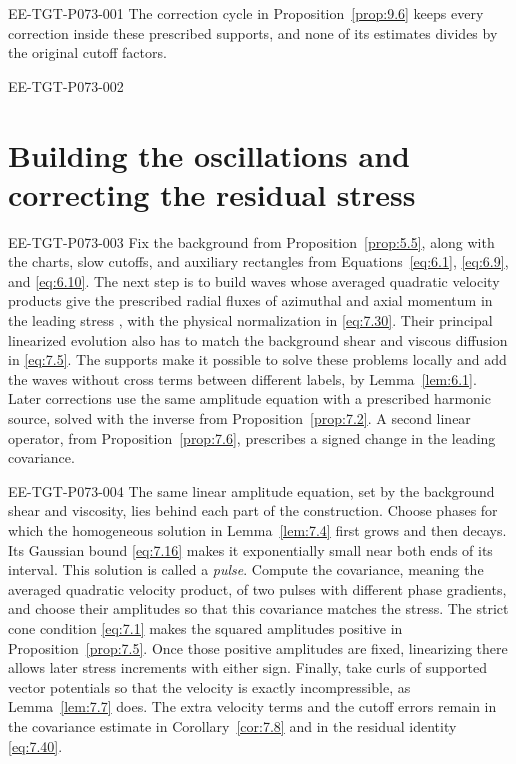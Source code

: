 %
\begin{EESegment}{EE-TGT-P073-001}
The correction cycle in Proposition~\ref{prop:9.6} keeps every correction inside these prescribed supports, and none of its estimates divides by the original cutoff factors.
\end{EESegment}

\begin{EESegment}{EE-TGT-P073-002}
\section{Building the oscillations and correcting the residual stress}\label{sec:7}
\end{EESegment}

\begin{EESegment}{EE-TGT-P073-003}
Fix the background  from Proposition~\ref{prop:5.5}, along with the charts, slow cutoffs, and auxiliary rectangles from Equations~\eqref{eq:6.1}, \eqref{eq:6.9}, and \eqref{eq:6.10}. The next step is to build waves whose averaged quadratic velocity products give the prescribed radial fluxes of azimuthal and axial momentum in the leading stress , with the physical normalization in \eqref{eq:7.30}. Their principal linearized evolution also has to match the background shear and viscous diffusion in \eqref{eq:7.5}. The supports make it possible to solve these problems locally and add the waves without cross terms between different labels, by Lemma~\ref{lem:6.1}. Later corrections use the same amplitude equation with a prescribed harmonic source, solved with the inverse from Proposition~\ref{prop:7.2}. A second linear operator,  from Proposition~\ref{prop:7.6}, prescribes a signed change in the leading covariance.
\end{EESegment}

\begin{EESegment}{EE-TGT-P073-004}
The same linear amplitude equation, set by the background shear and viscosity, lies behind each part of the construction. Choose phases for which the homogeneous solution  in Lemma~\ref{lem:7.4} first grows and then decays. Its Gaussian bound \eqref{eq:7.16} makes it exponentially small near both ends of its interval. This solution is called a \emph{pulse}. Compute the covariance, meaning the averaged quadratic velocity product, of two pulses with different phase gradients, and choose their amplitudes so that this covariance matches the stress. The strict cone condition \eqref{eq:7.1} makes the squared amplitudes positive in Proposition~\ref{prop:7.5}. Once those positive amplitudes are fixed, linearizing there allows later stress increments with either sign. Finally, take curls of supported vector potentials so that the velocity is exactly incompressible, as Lemma~\ref{lem:7.7} does. The extra velocity terms and the cutoff errors remain in the covariance estimate in Corollary~\ref{cor:7.8} and in the residual identity \eqref{eq:7.40}.
\end{EESegment}

